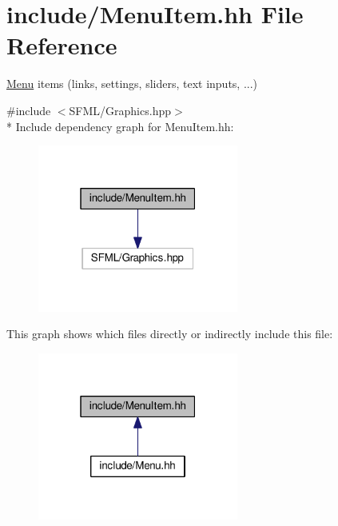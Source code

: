 \hypertarget{MenuItem_8hh}{}\section{include/\+Menu\+Item.hh File Reference}
\label{MenuItem_8hh}


\hyperlink{classMenu}{Menu} items (links, settings, sliders, text inputs, ...)  


{\ttfamily \#include $<$S\+F\+M\+L/\+Graphics.\+hpp$>$}\\*
Include dependency graph for Menu\+Item.\+hh\+:\nopagebreak
\begin{figure}[H]
\begin{center}
\leavevmode
\includegraphics[width=187pt]{MenuItem_8hh__incl}
\end{center}
\end{figure}
This graph shows which files directly or indirectly include this file\+:
\nopagebreak
\begin{figure}[H]
\begin{center}
\leavevmode
\includegraphics[width=187pt]{MenuItem_8hh__dep__incl}
\end{center}
\end{figure}
